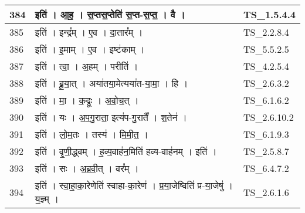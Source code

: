 \documentclass[17pt]{extarticle}
\begin{document}
\begin{longtable}{||p{0.4in}||p{4.9in}||p{0.9in}||}
    \hline
        
    384 & इति॑   ।   आ॒ह॒   ।   स॒प्तस॒प्तेति॑ स॒प्त{-}स॒प्त॒   ।   वै   ।    & TS\_1.5.4.4       \\
    
    \hline
        
    385 & इति॑   ।   इन्द्र᳚म्   ।   ए॒व   ।   दा॒तार᳚म्   ।    & TS\_2.2.8.4       \\
    
    \hline
        
    386 & इति॑   ।   इ॒माम्   ।   ए॒व   ।   इष्ट॑काम्   ।    & TS\_5.5.2.5       \\
    
    \hline
        
    387 & इति॑   ।   त्वा॒   ।   अ॒हम्   ।   परीति॑   ।    & TS\_4.2.5.4       \\
    
    \hline
        
    388 & इति॑   ।   ब्रू॒या॒त्   ।   अया॑तया॒मेत्यया॑त{-}या॒मा॒   ।   हि   ।    & TS\_2.6.3.2       \\
    
    \hline
        
    389 & इति॑   ।   मा॒   ।   क॒द्रूः   ।   अ॒वो॒च॒त्   ।    & TS\_6.1.6.2       \\
    
    \hline
        
    390 & इति॑   ।   यः   ।   अ॒प॒गु॒राता॒ इत्य॑प{-}गु॒रातै᳚   ।   श॒तेन॑   ।    & TS\_2.6.10.2       \\
    
    \hline
        
    391 & इति॑   ।   लो॒म॒तः   ।   तस्य॑   ।   मि॒मी॒त॒   ।    & TS\_6.1.9.3       \\
    
    \hline
        
    392 & इति॑   ।   वृ॒णी॒द्ध्वम्   ।   ह॒व्य॒वाह॑न॒मिति॑ हव्य{-}वाह॑नम्   ।   इति॑   ।    & TS\_2.5.8.7       \\
    
    \hline
        
    393 & इति॑   ।   सः   ।   अ॒ब्र॒वी॒त्   ।   वर᳚म्   ।    & TS\_6.4.7.2       \\
    
    \hline
        
    394 & इति॑   ।   स्वा॒हा॒का॒रेणेति॑ स्वाहा{-}का॒रेण॑   ।   प्र॒या॒जेष्विति॑ प्र{-}या॒जेषु॑   ।   य॒ज्ञ्म्   ।    & TS\_2.6.1.6       \\
    

\end{longtable}
\end{document}
